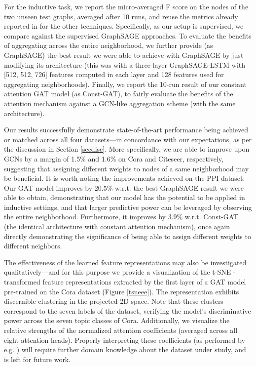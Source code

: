 \documentclass{article} \usepackage{iclr2018_conference,times}
\begin{document}
For the inductive task, we report the micro-averaged F score on the nodes of the two unseen test graphs, averaged after 10 runs, and reuse the metrics already reported in \cite{hamilton2017inductive} for the other techniques. Specifically, as our setup is supervised, we compare against the supervised GraphSAGE approaches. To evaluate the benefits of aggregating across the entire neighborhood, we further provide (as GraphSAGE) the best result we were able to achieve with GraphSAGE by just modifying its architecture (this was with a three-layer GraphSAGE-LSTM with [512, 512, 726] features computed in each layer and 128 features used for aggregating neighborhoods). Finally, we report the 10-run result of our constant attention GAT model (as Const-GAT), to fairly evaluate the benefits of the attention mechanism against a GCN-like aggregation scheme (with the same architecture).

Our results successfully demonstrate state-of-the-art performance being achieved or matched across all four datasets---in concordance with our expectations, as per the discussion in Section \ref{secdisc}. More specifically, we are able to improve upon GCNs by a margin of 1.5\% and 1.6\% on Cora and Citeseer, respectively, suggesting that assigning different weights to nodes of a same neighborhood may be beneficial. It is worth noting the improvements achieved on the PPI dataset: Our GAT model improves by 20.5\% w.r.t. the best GraphSAGE result we were able to obtain, demonstrating that our model has the potential to be applied in inductive settings, and that larger predictive power can be leveraged by observing the entire neighborhood. Furthermore, it improves by 3.9\% w.r.t. Const-GAT (the identical architecture with constant attention mechanism), once again directly demonstrating the significance of being able to assign different weights to different neighbors.

The effectiveness of the learned feature representations may also be investigated qualitatively---and for this purpose we provide a visualization of the t-SNE \citep{maaten2008visualizing}-transformed feature representations extracted by the first layer of a GAT model pre-trained on the Cora dataset (Figure \ref{tsneee}). The representation exhibits discernible clustering in the projected 2D space. Note that these clusters correspond to the seven labels of the dataset, verifying the model's discriminative power across the seven topic classes of Cora. Additionally, we visualize the relative strengths of the normalized attention coefficients (averaged across all eight attention heads). Properly interpreting these coefficients (as performed by e.g. \cite{bahdanau2014neural}) will require further domain knowledge about the dataset under study, and is left for future work.
\end{document}
